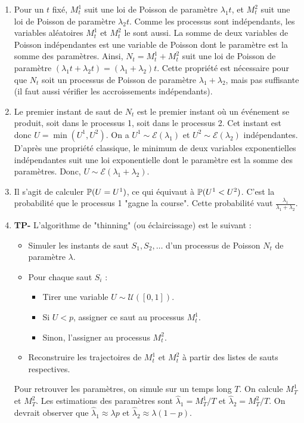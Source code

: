 \documentclass[solutions]{exercices}
\begin{document}
\begin{solution}
\begin{enumerate}
    \item Pour un $t$ fixé, $M^1_t$ suit une loi de Poisson de paramètre $\lambda_1 t$, et $M^2_t$ suit une loi de Poisson de paramètre $\lambda_2 t$. Comme les processus sont indépendants, les variables aléatoires $M^1_t$ et $M^2_t$ le sont aussi. La somme de deux variables de Poisson indépendantes est une variable de Poisson dont le paramètre est la somme des paramètres.
    Ainsi, $N_t = M^1_t + M^2_t$ suit une loi de Poisson de paramètre $(\lambda_1 t + \lambda_2 t) = (\lambda_1 + \lambda_2)t$.
    Cette propriété est nécessaire pour que $N_t$ soit un processus de Poisson de paramètre $\lambda_1+\lambda_2$, mais pas suffisante (il faut aussi vérifier les accroissements indépendants).
    \item Le premier instant de saut de $N_t$ est le premier instant où un événement se produit, soit dans le processus 1, soit dans le processus 2. Cet instant est donc $U = \min(U^1, U^2)$.
    On a $U^1 \sim \mathcal{E}(\lambda_1)$ et $U^2 \sim \mathcal{E}(\lambda_2)$ indépendantes. D'après une propriété classique, le minimum de deux variables exponentielles indépendantes suit une loi exponentielle dont le paramètre est la somme des paramètres. Donc, $U \sim \mathcal{E}(\lambda_1+\lambda_2)$.
    \item Il s'agit de calculer $\P(U=U^1)$, ce qui équivaut à $\P(U^1 < U^2)$. C'est la probabilité que le processus 1 "gagne la course". Cette probabilité vaut $\frac{\lambda_1}{\lambda_1+\lambda_2}$.
    \item \textbf{TP-} L'algorithme de "thinning" (ou éclaircissage) est le suivant :
    \begin{itemize}
        \item Simuler les instants de saut $S_1, S_2, \dots$ d'un processus de Poisson $N_t$ de paramètre $\lambda$.
        \item Pour chaque saut $S_i$ :
        \begin{itemize}
            \item Tirer une variable $U \sim \mathcal{U}([0,1])$.
            \item Si $U < p$, assigner ce saut au processus $M^1_t$.
            \item Sinon, l'assigner au processus $M^2_t$.
        \end{itemize}
        \item Reconstruire les trajectoires de $M^1_t$ et $M^2_t$ à partir des listes de sauts respectives.
    \end{itemize}
    Pour retrouver les paramètres, on simule sur un temps long $T$. On calcule $M^1_T$ et $M^2_T$. Les estimations des paramètres sont $\hat{\lambda}_1 = M^1_T / T$ et $\hat{\lambda}_2 = M^2_T / T$. On devrait observer que $\hat{\lambda}_1 \approx \lambda p$ et $\hat{\lambda}_2 \approx \lambda (1-p)$.
\end{enumerate}
\end{solution}
\end{document}
